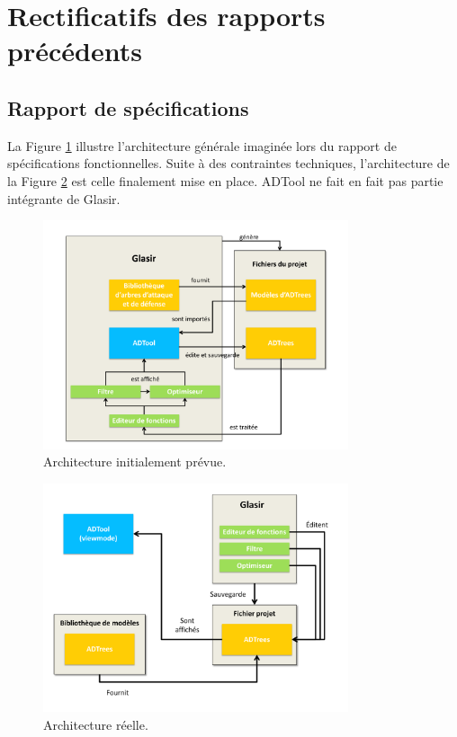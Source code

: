 \section{Rectificatifs des rapports précédents}
\subsection{Rapport de spécifications}

La {\sc Figure} \ref{fig:archiPrevue} illustre l'architecture générale imaginée lors du rapport de spécifications fonctionnelles. Suite à des contraintes techniques, l'architecture de la {\sc Figure} \ref{fig:archiReelle} est celle finalement mise en place. ADTool ne fait en fait pas partie intégrante de Glasir.

		\begin{figure}[H]
            \centering
                \includegraphics[width=0.8\textwidth]{figure/archiGlasir.pdf}
            \caption{Architecture initialement prévue.}
            \label{fig:archiPrevue}
        \end{figure}


		
        
        \begin{figure}[H]
            \centering
                \includegraphics[width=0.8\textwidth]{figure/archiReelle.pdf}
            \caption{Architecture réelle.}
            \label{fig:archiReelle}
        \end{figure}
        

